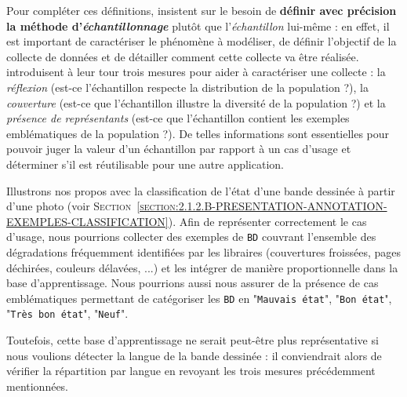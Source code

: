 			Pour compléter ces définitions, \cite{kruskal-mosteller:1979:representative-sampling-ii} insistent sur le besoin de \textbf{définir avec précision la méthode d'\textit{échantillonnage}} plutôt que l'\textit{échantillon} lui-même : en effet, il est important de caractériser le phénomène à modéliser, de définir l'objectif de la collecte de données et de détailler comment cette collecte va être réalisée.
			\cite{clemmensen-kjaersgaard:2022:data-representativity-machine} introduisent à leur tour trois mesures pour aider à caractériser une collecte : la \textit{réflexion} (est-ce l'échantillon respecte la distribution de la population ?), la \textit{couverture} (est-ce que l'échantillon illustre la diversité de la population ?) et la \textit{présence de représentants} (est-ce que l'échantillon contient les exemples emblématiques de la population ?).
			De telles informations sont essentielles pour pouvoir juger la valeur d'un échantillon par rapport à un cas d'usage et déterminer s'il est réutilisable pour une autre application.
			\begin{leftBarExamples}
				Illustrons nos propos avec la classification de l'état d'une bande dessinée à partir d'une photo (voir \textsc{Section~\ref{section:2.1.2.B-PRESENTATION-ANNOTATION-EXEMPLES-CLASSIFICATION}}).
				Afin de représenter correctement le cas d'usage, nous pourrions collecter des exemples de \texttt{BD} couvrant l'ensemble des dégradations fréquemment identifiées par les libraires (couvertures froissées, pages déchirées, couleurs délavées, ...) et les intégrer de manière proportionnelle dans la base d'apprentissage.
				Nous pourrions aussi nous assurer de la présence de cas emblématiques permettant de catégoriser les \texttt{BD} en "\texttt{Mauvais état}", "\texttt{Bon état}", "\texttt{Très bon état}", "\texttt{Neuf}".
				
				Toutefois, cette base d'apprentissage ne serait peut-être plus représentative si nous voulions détecter la langue de la bande dessinée : il conviendrait alors de vérifier la répartition par langue en revoyant les trois mesures précédemment mentionnées.
			\end{leftBarExamples}
			

